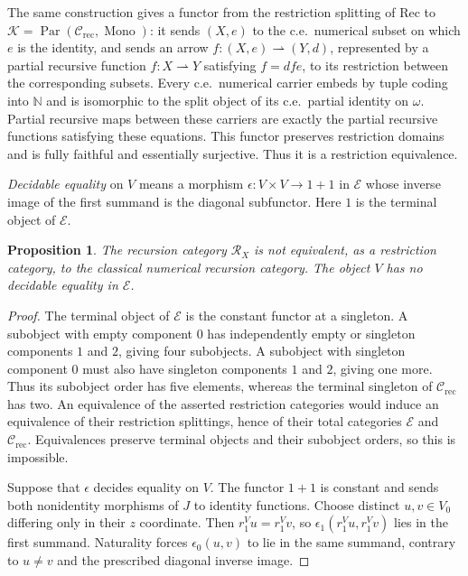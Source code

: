 \documentclass[11pt]{article}
\newtheorem{proposition}[theorem]{Proposition}
\newcommand{\N}{\mathbb N}
\begin{document}
The same construction gives a functor from the restriction splitting
of $\mathrm{Rec}$ to
$\mathcal K=\operatorname{Par}(\mathcal C_{\mathrm{rec}},
\operatorname{Mono})$: it sends $(X,e)$ to the c.e.\ numerical subset
on which $e$ is the identity, and sends an arrow
$f:(X,e)\rightharpoonup(Y,d)$, represented by a partial recursive
function $f:X\rightharpoonup Y$ satisfying $f=dfe$, to its
restriction between the corresponding subsets. Every c.e.\
numerical carrier embeds by tuple coding into $\N$ and is
isomorphic to the split object of its c.e.\ partial identity
on $\omega$. Partial recursive maps between these carriers are
exactly the partial recursive functions satisfying these equations.
This functor preserves restriction domains and is fully faithful
and essentially surjective. Thus it is a restriction equivalence.

\emph{Decidable equality} on $V$ means a morphism
$\epsilon:V\times V\to1+1$ in $\mathcal E$ whose inverse image of
the first summand is the diagonal subfunctor. Here $1$ is the terminal object of $\mathcal E$.

\begin{proposition}\label{prop:fork-distinction}
The recursion category $\mathscr R_X$ is not equivalent, as a
restriction category, to the classical numerical recursion category.
The object $V$ has no decidable equality in $\mathcal E$.
\end{proposition}
\begin{proof}
The terminal object of $\mathcal E$ is the constant functor at a singleton.
A subobject with empty component $0$ has independently empty or
singleton components $1$ and $2$, giving four subobjects. A
subobject with singleton component $0$ must also have singleton
components $1$ and $2$, giving one more. Thus its subobject order has five elements, whereas
the terminal singleton of $\mathcal C_{\mathrm{rec}}$ has two.
An equivalence of the asserted restriction categories would induce
an equivalence of their restriction splittings, hence of their
total categories $\mathcal E$ and $\mathcal C_{\mathrm{rec}}$.
Equivalences preserve terminal objects and their subobject orders,
so this is impossible.

Suppose that $\epsilon$ decides equality on $V$. The functor $1+1$
is constant and sends both nonidentity morphisms of $J$ to
identity functions. Choose distinct $u,v\in V_0$ differing only
in their $z$ coordinate. Then $r_1^Vu=r_1^Vv$, so
$\epsilon_1(r_1^Vu,r_1^Vv)$ lies in the first summand.
Naturality forces $\epsilon_0(u,v)$ to lie in the same summand,
contrary to $u\ne v$ and the prescribed diagonal inverse image.
\end{proof}
\end{document}

